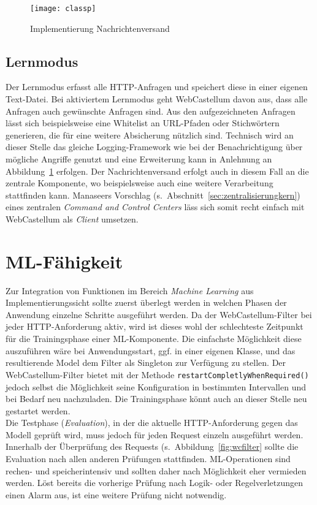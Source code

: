\begin{figure}[h]
  \begin{center}
    \texttt{[image: classp]}
    \caption{Implementierung Nachrichtenversand}
    \label{fig.impversand}
  \end{center}
\end{figure}

\subsection{Lernmodus}
Der Lernmodus erfasst alle HTTP-Anfragen und speichert diese in einer eigenen Text-Datei. Bei aktiviertem Lernmodus geht WebCastellum davon aus, dass alle Anfragen auch gewünschte Anfragen sind. Aus den aufgezeichneten Anfragen lässt sich beispielsweise eine Whitelist an URL-Pfaden oder Stichwörtern generieren, die für eine weitere Absicherung nützlich sind. Technisch wird an dieser Stelle das gleiche Logging-Framework wie bei der Benachrichtigung über mögliche Angriffe genutzt und eine Erweiterung kann in Anlehnung an Abbildung~\ref{fig.impversand} erfolgen. Der Nachrichtenversand erfolgt auch in diesem Fall an die zentrale Komponente, wo beispielsweise auch eine weitere Verarbeitung stattfinden kann. Manaseers Vorschlag (s.~Abschnitt~\ref{sec:zentralisierungkern}) eines zentralen \glqq\emph{Command and Control Centers}\grqq{} läss sich somit recht einfach mit WebCastellum als \emph{Client} umsetzen.


\section{ML-Fähigkeit}

Zur Integration von Funktionen im Bereich \emph{Machine Learning} aus Implementierungssicht sollte zuerst überlegt werden in welchen Phasen der Anwendung einzelne Schritte ausgeführt werden. Da der WebCastellum-Filter bei jeder HTTP-Anforderung aktiv, wird ist dieses wohl der schlechteste Zeitpunkt für die Trainingsphase einer ML-Komponente. Die einfachste Möglichkeit diese auszuführen wäre bei Anwendungsstart, ggf. in einer eigenen Klasse, und das resultierende Model dem Filter als Singleton zur Verfügung zu stellen. Der WebCastellum-Filter bietet mit der Methode \verb=restartCompletlyWhenRequired()= jedoch selbst die Möglichkeit seine Konfiguration in bestimmten Intervallen und bei Bedarf neu nachzuladen. Die Trainingsphase könnt auch an dieser Stelle neu gestartet werden.\\
Die Testphase (\emph{Evaluation}), in der die aktuelle HTTP-Anforderung gegen das Modell geprüft wird, muss jedoch für jeden Request einzeln ausgeführt werden. Innerhalb der Überprüfung des Requests (s.~Abbildung~\ref{fig:wcfilter} sollte die Evaluation nach allen anderen Prüfungen stattfinden. ML-Operationen sind rechen- und speicherintensiv und sollten daher nach Möglichkeit eher vermieden werden. Löst bereits die vorherige Prüfung nach Logik- oder Regelverletzungen einen Alarm aus, ist eine weitere Prüfung nicht notwendig.

